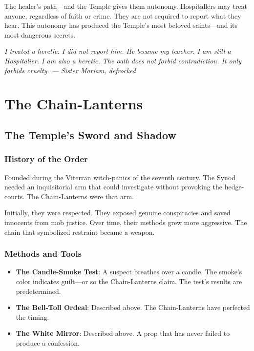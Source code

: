 \documentclass{book}
\newcommand{\citation}[1]{\textcolor{marginalia}{\small\textit{#1}}}
\begin{document}
The healer's path---and the Temple gives them autonomy. Hospitallers may treat anyone, regardless of faith or crime. They are not required to report what they hear. This autonomy has produced the Temple's most beloved saints---and its most dangerous secrets.

\citation{I treated a heretic. I did not report him. He became my teacher. I am still a Hospitalier. I am also a heretic. The oath does not forbid contradiction. It only forbids cruelty. --- Sister Mariam, defrocked}

\part{The Chain-Lanterns}

\chapter{The Temple's Sword and Shadow}

\section{History of the Order}

Founded during the Viterran witch-panics of the seventh century. The Synod needed an inquisitorial arm that could investigate without provoking the hedge-courts. The Chain-Lanterns were that arm.

Initially, they were respected. They exposed genuine conspiracies and saved innocents from mob justice. Over time, their methods grew more aggressive. The chain that symbolized restraint became a weapon.

\section{Methods and Tools}

\begin{itemize}
\item \textbf{The Candle-Smoke Test}: A suspect breathes over a candle. The smoke's color indicates guilt---or so the Chain-Lanterns claim. The test's results are predetermined.
\item \textbf{The Bell-Toll Ordeal}: Described above. The Chain-Lanterns have perfected the timing.
\item \textbf{The White Mirror}: Described above. A prop that has never failed to produce a confession.
\end{itemize}
\end{document}
